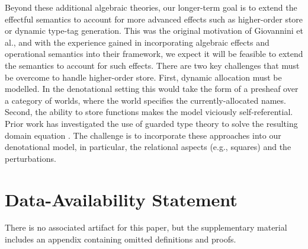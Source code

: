 \documentclass[acmsmall,screen,review,anonymous]{acmart}
\theoremstyle{remark}
\newenvironment{DIFnomarkup}{}{}
\newcommand{\bibliographypath}{references}
\newif\ifdraft
\renewcommand{\max}[1]{\ifdraft{\color{blue}[{\bf Max says}: #1]}\fi}
\begin{document}


Beyond these additional algebraic theories, our longer-term goal is to extend
the effectful semantics to account for more advanced effects such as
higher-order store or dynamic type-tag generation. This was the original
motivation of Giovannini et al., and with the experience gained in incorporating
algebraic effects and operational semantics into their framework, we expect it
will be feasible to extend the semantics to account for such effects. There are
two key challenges that must be overcome to handle higher-order store. First,
dynamic allocation must be modelled. In the denotational setting this would take
the form of a presheaf over a category of worlds, where the world specifies the
currently-allocated names. Second, the ability to store functions makes the
model viciously self-referential. Prior work has investigated the use of guarded
type theory to solve the resulting domain equation
\cite{DBLP:journals/corr/abs-2210-02169}. The challenge is to incorporate these
approaches into our denotational model, in particular, the relational aspects
(e.g., squares) and the perturbations.







\section*{Data-Availability Statement}
There is no associated artifact for this paper, but the supplementary material
includes an appendix containing omitted definitions and proofs.



\begin{DIFnomarkup}

\end{DIFnomarkup}

\begin{ifextended}
\newpage
\appendix

\end{ifextended}
\end{document}
